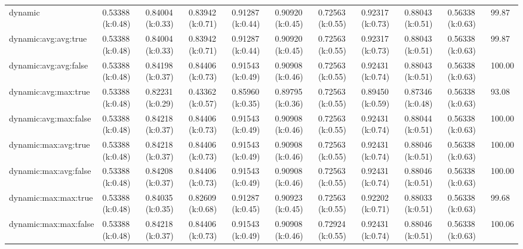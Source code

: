 \begin{tabular}{lllllllllll}
dynamic               &            0.53388 (k:0.48) &  0.84004 (k:0.33) &  0.83942 (k:0.71) &  0.91287 (k:0.44) &  0.90920 (k:0.45) &  0.72563 (k:0.55) &  0.92317 (k:0.73) &  0.88043 (k:0.51) &  0.56338 (k:0.63) &     99.87 \\
dynamic:avg:avg:true  &            0.53388 (k:0.48) &  0.84004 (k:0.33) &  0.83942 (k:0.71) &  0.91287 (k:0.44) &  0.90920 (k:0.45) &  0.72563 (k:0.55) &  0.92317 (k:0.73) &  0.88043 (k:0.51) &  0.56338 (k:0.63) &     99.87 \\
dynamic:avg:avg:false &            0.53388 (k:0.48) &  0.84198 (k:0.37) &  0.84406 (k:0.73) &  0.91543 (k:0.49) &  0.90908 (k:0.46) &  0.72563 (k:0.55) &  0.92431 (k:0.74) &  0.88043 (k:0.51) &  0.56338 (k:0.63) &    100.00 \\
dynamic:avg:max:true  &            0.53388 (k:0.48) &  0.82231 (k:0.29) &  0.43362 (k:0.57) &  0.85960 (k:0.35) &  0.89795 (k:0.36) &  0.72563 (k:0.55) &  0.89450 (k:0.59) &  0.87346 (k:0.48) &  0.56338 (k:0.63) &     93.08 \\
dynamic:avg:max:false &            0.53388 (k:0.48) &  0.84218 (k:0.37) &  0.84406 (k:0.73) &  0.91543 (k:0.49) &  0.90908 (k:0.46) &  0.72563 (k:0.55) &  0.92431 (k:0.74) &  0.88044 (k:0.51) &  0.56338 (k:0.63) &    100.00 \\
dynamic:max:avg:true  &            0.53388 (k:0.48) &  0.84218 (k:0.37) &  0.84406 (k:0.73) &  0.91543 (k:0.49) &  0.90908 (k:0.46) &  0.72563 (k:0.55) &  0.92431 (k:0.74) &  0.88046 (k:0.51) &  0.56338 (k:0.63) &    100.00 \\
dynamic:max:avg:false &            0.53388 (k:0.48) &  0.84208 (k:0.37) &  0.84406 (k:0.73) &  0.91543 (k:0.49) &  0.90908 (k:0.46) &  0.72563 (k:0.55) &  0.92431 (k:0.74) &  0.88046 (k:0.51) &  0.56338 (k:0.63) &    100.00 \\
dynamic:max:max:true  &            0.53388 (k:0.48) &  0.84035 (k:0.35) &  0.82609 (k:0.68) &  0.91287 (k:0.45) &  0.90923 (k:0.45) &  0.72563 (k:0.55) &  0.92202 (k:0.71) &  0.88033 (k:0.51) &  0.56338 (k:0.63) &     99.68 \\
dynamic:max:max:false &            0.53388 (k:0.48) &  0.84218 (k:0.37) &  0.84406 (k:0.73) &  0.91543 (k:0.49) &  0.90908 (k:0.46) &  0.72924 (k:0.55) &  0.92431 (k:0.74) &  0.88046 (k:0.51) &  0.56338 (k:0.63) &    100.06 \\
\bottomrule
\end{tabular}
